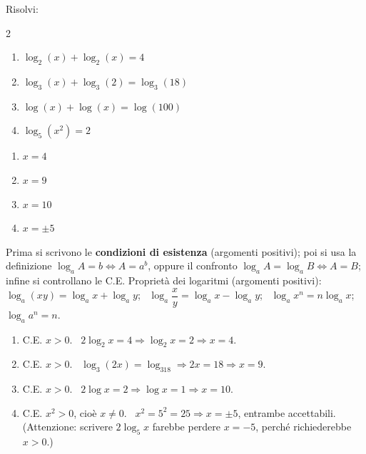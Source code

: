 \begin{question}[ID=2.4, subtitle={Equazioni logaritmiche con proprietà di somma}, difficulty=media, tags={equazioni logaritmiche, proprietà}]
Risolvi:
\begin{center}\begin{minipage}{0.92\linewidth}
\begin{multicols}{2}
\begin{enumerate}[leftmargin=3.2cm]
\item $\log_2(x) + \log_2(x) = 4$
\item $\log_3(x) + \log_3(2) = \log_3(18)$
\item $\log(x) + \log(x) = \log(100)$
\item $\log_5(x^2) = 2$
\end{enumerate}
\end{multicols}
\end{minipage}\end{center}
\begin{solution}
\begin{enumerate}
    \item $x=4$
    \item $x=9$
    \item $x=10$
    \item $x=\pm5$
\end{enumerate}
\end{solution}
\begin{explanation}
Prima si scrivono le \textbf{condizioni di esistenza} (argomenti positivi); poi si usa la definizione $\log_a A=b \iff A=a^b$, oppure il confronto $\log_aA=\log_aB \iff A=B$; infine si controllano le C.E.
Proprietà dei logaritmi (argomenti positivi): \ $\log_a(xy)=\log_ax+\log_ay$; \ $\log_a\dfrac xy=\log_ax-\log_ay$; \ $\log_a x^n=n\log_ax$; \ $\log_a a^n=n$.
\begin{enumerate}
    \item C.E. $x>0$. \ $2\log_2x=4 \Rightarrow \log_2x=2 \Rightarrow x=4$.
    \item C.E. $x>0$. \ $\log_3(2x)=\log_318 \Rightarrow 2x=18 \Rightarrow x=9$.
    \item C.E. $x>0$. \ $2\log x=2 \Rightarrow \log x=1 \Rightarrow x=10$.
    \item C.E. $x^2>0$, cioè $x\neq0$. \ $x^2=5^2=25 \Rightarrow x=\pm5$, entrambe accettabili. \\
    (Attenzione: scrivere $2\log_5x$ farebbe perdere $x=-5$, perché richiederebbe $x>0$.)
\end{enumerate}
\end{explanation}
\end{question}


